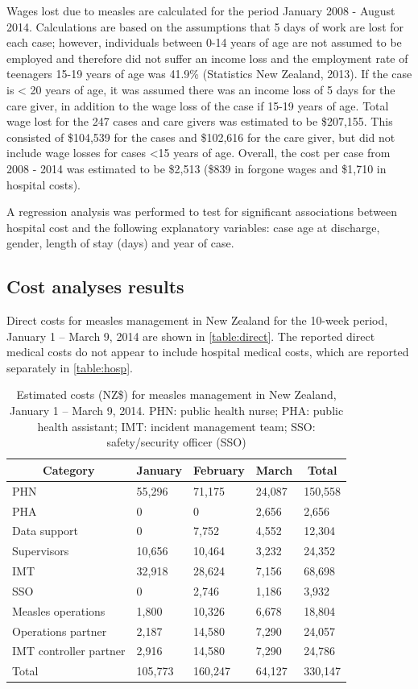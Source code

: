\documentclass{article}
\begin{document}
Wages lost due to measles are calculated for the period January 2008 - August 2014. Calculations are based on the assumptions that 5 days of work are lost for each case; however, individuals between 0-14 years of age are not assumed to be employed and therefore did not suffer an income loss and the employment rate of teenagers 15-19 years of age was 41.9\%  (Statistics New Zealand, 2013). If the case is < 20 years of age, it was assumed there was an income loss of 5 days for the care giver, in addition to the wage loss of the case if 15-19 years of age. Total wage lost for the 247 cases and care givers was estimated to be \$207,155. This consisted of \$104,539 for the cases and \$102,616 for the care giver, but did not include wage losses for cases <15 years of age. Overall, the cost per case from 2008 - 2014 was estimated to be \$2,513 (\$839 in forgone wages and \$1,710 in hospital costs).

A regression analysis was performed to test for significant associations between hospital cost and the following explanatory variables: case age at discharge, gender, length of stay (days) and year of case.

\subsection{Cost analyses results}

Direct costs for measles management in New Zealand for the 10-week period, January 1 -- March 9, 2014 are shown in  \autoref{table:direct}. The reported direct medical costs do not appear to include hospital medical costs, which are reported separately in \autoref{table:hosp}. 


\begin{table}
\caption{Estimated costs (NZ\$) for measles management in New Zealand, January 1 -- March 9, 2014. PHN: public health nurse; PHA: public health assistant; IMT: incident management team; SSO: safety/security officer (SSO)}
\begin{center}
\begin{tabular}{lllll}
\hline\hline
\multicolumn{1}{c}{Category}&\multicolumn{1}{c}{January}&\multicolumn{1}{c}{February}&\multicolumn{1}{c}{March}&\multicolumn{1}{c}{Total}\tabularnewline
\hline
PHN&55,296&71,175&24,087&150,558\tabularnewline
PHA&0&0&2,656&2,656\tabularnewline
Data support&0&7,752&4,552&12,304\tabularnewline
Supervisors&10,656&10,464&3,232&24,352\tabularnewline
IMT&32,918&28,624&7,156&68,698\tabularnewline
SSO&0&2,746&1,186&3,932\tabularnewline
Measles operations&1,800&10,326&6,678&18,804\tabularnewline
Operations partner&2,187&14,580&7,290&24,057\tabularnewline
IMT controller partner&2,916&14,580&7,290&24,786\tabularnewline
Total&105,773&160,247&64,127&330,147\tabularnewline
\hline
\end{tabular}\end{center}\label{table:direct}
\end{table}
\end{document}
